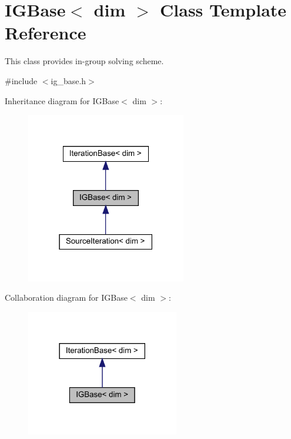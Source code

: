 \hypertarget{class_i_g_base}{}\section{I\+G\+Base$<$ dim $>$ Class Template Reference}
\label{class_i_g_base}


This class provides in-\/group solving scheme.  




{\ttfamily \#include $<$ig\+\_\+base.\+h$>$}



Inheritance diagram for I\+G\+Base$<$ dim $>$\+:\nopagebreak
\begin{figure}[H]
\begin{center}
\leavevmode
\includegraphics[width=198pt]{class_i_g_base__inherit__graph}
\end{center}
\end{figure}


Collaboration diagram for I\+G\+Base$<$ dim $>$\+:\nopagebreak
\begin{figure}[H]
\begin{center}
\leavevmode
\includegraphics[width=189pt]{class_i_g_base__coll__graph}
\end{center}
\end{figure}

